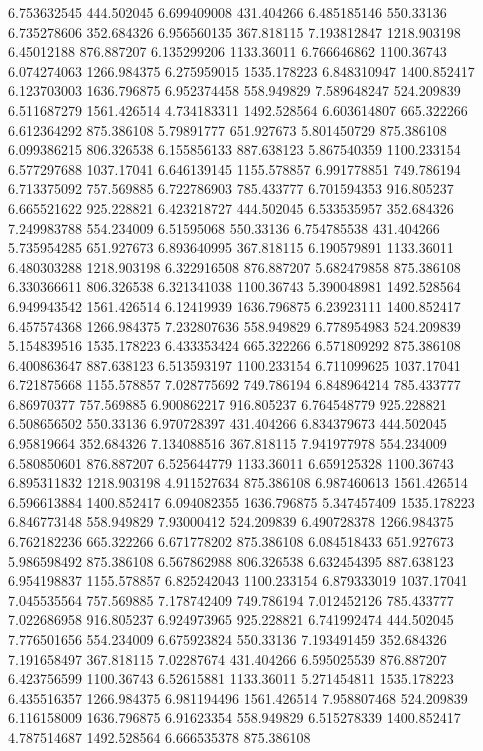 6.753632545	444.502045
6.699409008	431.404266
6.485185146	550.33136
6.735278606	352.684326
6.956560135	367.818115
7.193812847	1218.903198
6.45012188	876.887207
6.135299206	1133.36011
6.766646862	1100.36743
6.074274063	1266.984375
6.275959015	1535.178223
6.848310947	1400.852417
6.123703003	1636.796875
6.952374458	558.949829
7.589648247	524.209839
6.511687279	1561.426514
4.734183311	1492.528564
6.603614807	665.322266
6.612364292	875.386108
5.79891777	651.927673
5.801450729	875.386108
6.099386215	806.326538
6.155856133	887.638123
5.867540359	1100.233154
6.577297688	1037.17041
6.646139145	1155.578857
6.991778851	749.786194
6.713375092	757.569885
6.722786903	785.433777
6.701594353	916.805237
6.665521622	925.228821
6.423218727	444.502045
6.533535957	352.684326
7.249983788	554.234009
6.51595068	550.33136
6.754785538	431.404266
5.735954285	651.927673
6.893640995	367.818115
6.190579891	1133.36011
6.480303288	1218.903198
6.322916508	876.887207
5.682479858	875.386108
6.330366611	806.326538
6.321341038	1100.36743
5.390048981	1492.528564
6.949943542	1561.426514
6.12419939	1636.796875
6.23923111	1400.852417
6.457574368	1266.984375
7.232807636	558.949829
6.778954983	524.209839
5.154839516	1535.178223
6.433353424	665.322266
6.571809292	875.386108
6.400863647	887.638123
6.513593197	1100.233154
6.711099625	1037.17041
6.721875668	1155.578857
7.028775692	749.786194
6.848964214	785.433777
6.86970377	757.569885
6.900862217	916.805237
6.764548779	925.228821
6.508656502	550.33136
6.970728397	431.404266
6.834379673	444.502045
6.95819664	352.684326
7.134088516	367.818115
7.941977978	554.234009
6.580850601	876.887207
6.525644779	1133.36011
6.659125328	1100.36743
6.895311832	1218.903198
4.911527634	875.386108
6.987460613	1561.426514
6.596613884	1400.852417
6.094082355	1636.796875
5.347457409	1535.178223
6.846773148	558.949829
7.93000412	524.209839
6.490728378	1266.984375
6.762182236	665.322266
6.671778202	875.386108
6.084518433	651.927673
5.986598492	875.386108
6.567862988	806.326538
6.632454395	887.638123
6.954198837	1155.578857
6.825242043	1100.233154
6.879333019	1037.17041
7.045535564	757.569885
7.178742409	749.786194
7.012452126	785.433777
7.022686958	916.805237
6.924973965	925.228821
6.741992474	444.502045
7.776501656	554.234009
6.675923824	550.33136
7.193491459	352.684326
7.191658497	367.818115
7.02287674	431.404266
6.595025539	876.887207
6.423756599	1100.36743
6.52615881	1133.36011
5.271454811	1535.178223
6.435516357	1266.984375
6.981194496	1561.426514
7.958807468	524.209839
6.116158009	1636.796875
6.91623354	558.949829
6.515278339	1400.852417
4.787514687	1492.528564
6.666535378	875.386108
